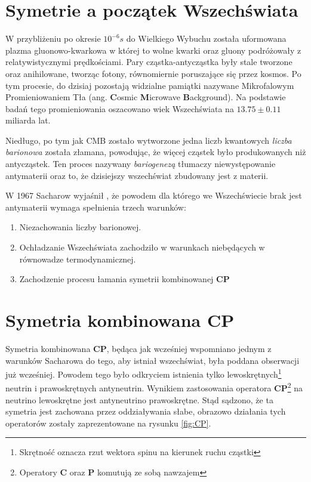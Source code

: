 \section{Symetrie a początek Wszechświata}
W przybliżeniu po okresie $10^{-6}s$ do Wielkiego Wybuchu została uformowana plazma gluonowo-kwarkowa w której to wolne kwarki oraz gluony podróżowały z relatywistycznymi prędkościami. Pary cząstka-antycząstka były stale tworzone oraz anihilowane, tworząc fotony, równomiernie poruszające się przez kosmos. Po tym procesie, do dzisiaj pozostają widzialne pamiątki nazywane Mikrofalowym Promieniowaniem Tła (ang. \textbf{C}osmic \textbf{M}icrowave \textbf{B}ackground). Na podstawie badań tego promieniowania oszacowano wiek Wszechświata na $13.75 \pm 0.11$ miliarda lat.

Niedługo, po tym jak CMB zostało wytworzone jedna liczb kwantowych \textit{liczba barionowa} została złamana, powodując, że więcej cząstek było produkowanych niż antycząstek. Ten proces nazywany \textit{bariogenezą} tłumaczy niewystępowanie antymaterii oraz to, że dzisiejszy wszechświat zbudowany jest z materii.

W 1967 Sacharow  wyjaśnił \cite{Sacharow}, że powodem dla którego we Wszechświecie brak jest antymaterii wymaga spełnienia trzech warunków:
\begin{enumerate}
\item Niezachowania liczby barionowej. 
\item Ochładzanie Wszechświata zachodziło w warunkach niebędących w równowadze termodynamicznej. 
\item Zachodzenie procesu łamania symetrii kombinowanej \textbf{CP} 
\end{enumerate}

\section{Symetria kombinowana \textbf{CP}}
Symetria kombinowana \textbf{CP}, będąca jak wcześniej wspomniano jednym z warunków Sacharowa do tego, aby istniał wszechświat, była poddana obserwacji już wcześniej. Powodem tego było odkryciem istnienia tylko lewoskrętnych\footnote{Skrętność oznacza rzut wektora spinu na kierunek ruchu cząstki} neutrin i prawoskrętnych antyneutrin. Wynikiem zastosowania operatora \textbf{CP}\footnote{Operatory \textbf{C} oraz \textbf{P} komutują ze sobą nawzajem} na neutrino lewoskrętne jest antyneutrino prawoskrętne. Stąd sądzono, że ta symetria jest zachowana przez oddziaływania słabe, obrazowo działania tych operatorów zostały zaprezentowane na rysunku \ref{fig:CP}.


